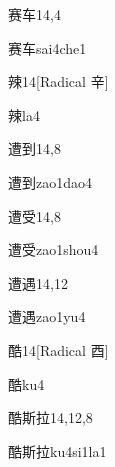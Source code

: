 \begin{entry}{赛车}{14,4}
  \begin{phonetics}{赛车}{sai4che1}
  \end{phonetics}
\end{entry}

\begin{entry}{辣}{14}[Radical 辛]
  \begin{phonetics}{辣}{la4}
  \end{phonetics}
\end{entry}

\begin{entry}{遭到}{14,8}
  \begin{phonetics}{遭到}{zao1dao4}
  \end{phonetics}
\end{entry}

\begin{entry}{遭受}{14,8}
  \begin{phonetics}{遭受}{zao1shou4}
  \end{phonetics}
\end{entry}

\begin{entry}{遭遇}{14,12}
  \begin{phonetics}{遭遇}{zao1yu4}
  \end{phonetics}
\end{entry}

\begin{entry}{酷}{14}[Radical 酉]
  \begin{phonetics}{酷}{ku4}
  \end{phonetics}
\end{entry}

\begin{entry}{酷斯拉}{14,12,8}
  \begin{phonetics}{酷斯拉}{ku4si1la1}
  \end{phonetics}
\end{entry}

